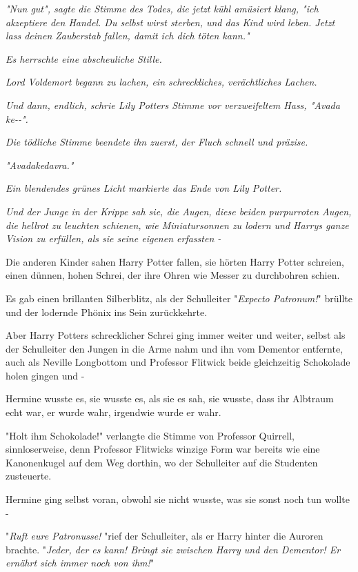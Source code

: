 {\emph{\emph{"Nun gut", sagte die Stimme des Todes, die jetzt kühl amüsiert klang, "ich akzeptiere den Handel. Du selbst wirst sterben, und das Kind wird leben. Jetzt lass deinen Zauberstab fallen, damit ich dich töten kann."}}

\emph{\emph{Es herrschte eine abscheuliche Stille.}}

\emph{\emph{Lord Voldemort begann zu lachen, ein schreckliches, verächtliches Lachen.}}

\emph{\emph{Und dann, endlich, schrie Lily Potters Stimme vor verzweifeltem Hass, "Avada ke-\/-".}}

\emph{\emph{Die tödliche Stimme beendete ihn zuerst, der Fluch schnell und präzise.}}

\emph{\emph{"Avadakedavra."}}

\emph{\emph{Ein blendendes grünes Licht markierte das Ende von Lily Potter.}}

\emph{\emph{Und der Junge in der Krippe sah sie, die Augen, diese beiden purpurroten Augen, die hellrot zu leuchten schienen, wie Miniatursonnen zu lodern und Harrys ganze Vision zu erfüllen, als sie seine eigenen erfassten -}}

Die anderen Kinder sahen Harry Potter fallen, sie hörten Harry Potter schreien, einen dünnen, hohen Schrei, der ihre Ohren wie Messer zu durchbohren schien.

Es gab einen brillanten Silberblitz, als der Schulleiter "\emph{Expecto Patronum!}" brüllte und der lodernde Phönix ins Sein zurückkehrte.

Aber Harry Potters schrecklicher Schrei ging immer weiter und weiter, selbst als der Schulleiter den Jungen in die Arme nahm und ihn vom Dementor entfernte, auch als Neville Longbottom und Professor Flitwick beide gleichzeitig Schokolade holen gingen und -

Hermine wusste es, sie wusste es, als sie es sah, sie wusste, dass ihr Albtraum echt war, er wurde wahr, irgendwie wurde er wahr.

"Holt ihm Schokolade!" verlangte die Stimme von Professor Quirrell, sinnloserweise, denn Professor Flitwicks winzige Form war bereits wie eine Kanonenkugel auf dem Weg dorthin, wo der Schulleiter auf die Studenten zusteuerte.

Hermine ging selbst voran, obwohl sie nicht wusste, was sie sonst noch tun wollte -

"\emph{Ruft eure Patronusse!} "rief der Schulleiter, als er Harry hinter die Auroren brachte. "\emph{Jeder, der es kann! Bringt sie zwischen Harry und den Dementor! Er} \emph{ernährt sich immer noch von ihm!}"

}
